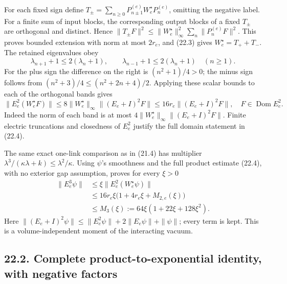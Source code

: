 \documentclass[
]{article}
\begin{document}
For each fixed sign define
\(T_\pm=\sum_{n\ge0}P_{n\pm1}^{(e)}W_e^\star P_n^{(e)}\), omitting the
negative label. For a finite sum of input blocks, the corresponding
output blocks of a fixed \(T_\pm\) are orthogonal and distinct. Hence
\(\|T_\pm F\|^2\le\|W_e^\star\|_\infty^2\sum_n\|P_n^{(e)}F\|^2\). This
proves bounded extension with norm at most \(2r_e\), and (22.3) gives
\(W_e^\star=T_++T_-\). The retained eigenvalues obey \[
\lambda_{n+1}+1\le2(\lambda_n+1),\qquad
\lambda_{n-1}+1\le2(\lambda_n+1)\quad(n\ge1).
\] For the plus sign the difference on the right is \((n^2+1)/4>0\); the
minus sign follows from \((n^2+3)/4\le(n^2+2n+4)/2\). Applying these
scalar bounds to each of the orthogonal bands gives \[
\|E_e^2(W_e^\star F)\|
 \le8\|W_e^\star\|_\infty\|(E_e+I)^2F\|
 \le16r_e\|(E_e+I)^2F\|,
\quad F\in\operatorname{Dom}E_e^2 .                            \tag{22.4}
\] Indeed the norm of each band is at most
\(4\|W_e^\star\|_\infty\|(E_e+I)^2F\|\). Finite electric truncations and
closedness of \(E_e^2\) justify the full domain statement in (22.4).

The same exact one-link comparison as in (21.4) has multiplier
\(\lambda^3/(\kappa\lambda+k)\le\lambda^2/\kappa\). Using \(\psi\)'s
smoothness and the full product estimate (22.4), with no exterior gap
assumption, proves for every \(\xi>0\) \[
\begin{aligned}
\|E_e^3\psi\|
 &\le \xi\|E_e^2(W_e^\star\psi)\|\\
 &\le16r_e\xi\bigl(1+4r_e\xi+M_{2,e}(\xi)\bigr)\\
 &\le M_3(\xi):=64\xi(1+22\xi+128\xi^2).
\end{aligned}                                                   \tag{22.5}
\] Here \(\|(E_e+I)^2\psi\|\le
\|E_e^2\psi\|+2\|E_e\psi\|+\|\psi\|\); every term is kept. This is a
volume-independent moment of the interacting vacuum.

\subsection{22.2. Complete product-to-exponential identity, with
negative
factors}\label{complete-product-to-exponential-identity-with-negative-factors}
\end{document}
